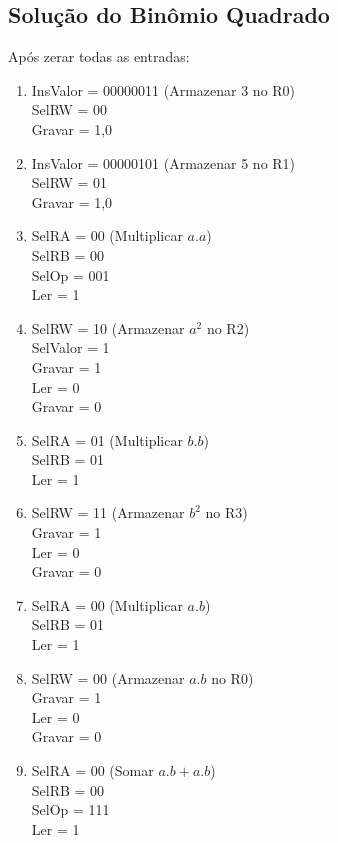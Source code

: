 \documentclass[]{article}
\begin{document}
	\subsection{Solução do Binômio Quadrado}
		Após zerar todas as entradas:
		\begin{enumerate}
			\item InsValor = 00000011 (Armazenar 3 no R0)
			\\ SelRW = 00
			\\ Gravar = 1,0
			
			\item InsValor = 00000101 (Armazenar 5 no R1)
			\\ SelRW = 01
			\\ Gravar = 1,0
			
			\item SelRA = 00 (Multiplicar $a.a$)
			\\ SelRB = 00
			\\ SelOp = 001
			\\ Ler = 1
			
			\item SelRW = 10 (Armazenar $a^2$ no R2)
			\\ SelValor = 1
			\\ Gravar = 1
			\\ Ler = 0
			\\ Gravar = 0
			
			\item SelRA = 01 (Multiplicar $b.b$)
			\\ SelRB = 01
			\\ Ler = 1
			
			\item SelRW = 11 (Armazenar $b^2$ no R3)
			\\ Gravar = 1
			\\ Ler = 0
			\\ Gravar = 0
			
			\item SelRA = 00 (Multiplicar $a.b$)
			\\ SelRB = 01
			\\ Ler = 1
			
			\item SelRW = 00 (Armazenar $a.b$ no R0)
			\\ Gravar = 1
			\\ Ler = 0
			\\ Gravar = 0
			
			\item SelRA = 00 (Somar $a.b + a.b$)
			\\ SelRB = 00
			\\ SelOp = 111
			\\ Ler = 1
			

\end{enumerate}
\end{document}
